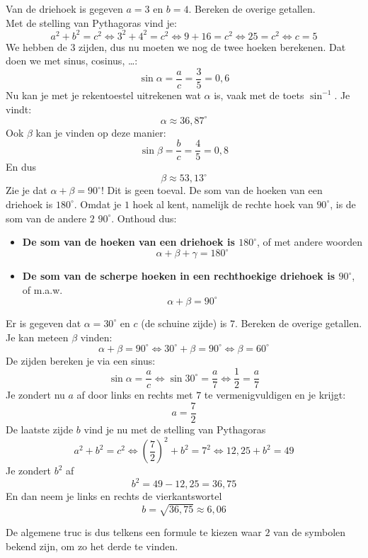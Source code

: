 \begin{voorbeeld}
	Van de driehoek is gegeven $a = 3$ en $b = 4$. Bereken de overige getallen.\\
Met de stelling van Pythagoras vind je:
\[a^2+b^2=c^2 \Leftrightarrow 3^2+4^2=c^2 \Leftrightarrow 9+16=c^2 \Leftrightarrow 25=c^2 \Leftrightarrow c=5\]
We hebben de $3$ zijden, dus nu moeten we nog de twee hoeken berekenen. Dat doen we met sinus, cosinus, \ldots:
\[\sin \alpha = \frac{a}{c} = \frac{3}{5} = 0,6\]
Nu kan je met je rekentoestel uitrekenen wat $\alpha$ is, vaak met de toets $\sin^{-1}$. Je vindt:
\[\alpha \approx 36,87^\circ\]
Ook $\beta$ kan je vinden op deze manier:
\[\sin \beta = \frac{b}{c}=\frac{4}{5}=0,8\]
En dus
\[\beta \approx 53,13^\circ\]
Zie je dat $\alpha+\beta = 90^\circ$! Dit is geen toeval. De som van de hoeken van een driehoek is $180^\circ$. Omdat je $1$ hoek al kent, namelijk de rechte hoek van $90^\circ$, is de som van de andere $2$ $90^\circ$. Onthoud dus:

\begin{itemize}
	\item \textbf{De som van de hoeken van een driehoek is $180^\circ$}, of met andere woorden
	\[\alpha+\beta+\gamma=180^\circ\]
	\item \textbf{De som van de scherpe hoeken in een rechthoekige driehoek is $90^\circ$}, of m.a.w.
	\[\alpha+\beta = 90^\circ\]
\end{itemize}

\end{voorbeeld}

\begin{voorbeeld}
	Er is gegeven dat $\alpha = 30^\circ$ en $c$ (de schuine zijde) is $7$. Bereken de overige getallen.\\
Je kan meteen $\beta$ vinden:
\[\alpha+\beta=90^\circ \Leftrightarrow 30^\circ + \beta = 90^\circ \Leftrightarrow \beta = 60^\circ\]
De zijden bereken je via een sinus:
\[\sin \alpha = \frac{a}{c}\Leftrightarrow \sin 30^\circ = \frac{a}{7}\Leftrightarrow \frac{1}{2}=\frac{a}{7}\]
Je zondert nu $a$ af door links en rechts met $7$ te vermenigvuldigen en je krijgt:
\[a = \frac{7}{2}\]
De laatste zijde $b$ vind je nu met de stelling van Pythagoras
\[a^2+b^2=c^2 \Leftrightarrow \left(\frac{7}{2}\right)^2+b^2=7^2 \Leftrightarrow 12,25+b^2=49\]
Je zondert $b^2$ af
\[b^2=49-12,25=36,75\]
En dan neem je links en rechts de vierkantswortel
\[b=\sqrt{36,75}\approx 6,06\]
\end{voorbeeld}

De algemene truc is dus telkens een formule te kiezen waar $2$ van de symbolen bekend zijn, om zo het derde te vinden.

